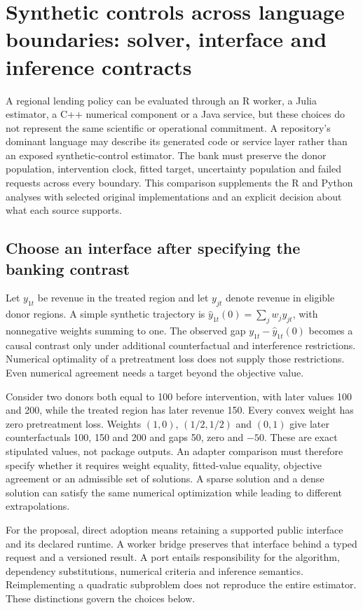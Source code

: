 \section{Synthetic controls across language boundaries: solver, interface and inference contracts}
\label{sec:exec25-synthetic-crosslanguage}

A regional lending policy can be evaluated through an R worker, a Julia
estimator, a C++ numerical component or a Java service, but these choices
do not represent the same scientific or operational commitment. A repository's
dominant language may describe its generated code or service layer rather
than an exposed synthetic-control estimator. The bank must preserve the
donor population, intervention clock, fitted target, uncertainty population
and failed requests across every boundary. This comparison supplements the
R and Python analyses with selected original implementations and an explicit
decision about what each source supports.~\citep{exec25_synthcross_choice}

\subsection{Choose an interface after specifying the banking contrast}
Let $y_{1t}$ be revenue in the treated region and let $y_{jt}$ denote revenue
in eligible donor regions. A simple synthetic trajectory is
$\widehat y_{1t}(0)=\sum_j w_jy_{jt}$, with nonnegative weights summing to one.
The observed gap $y_{1t}-\widehat y_{1t}(0)$ becomes a causal contrast only
under additional counterfactual and interference restrictions. Numerical
optimality of a pretreatment loss does not supply those restrictions.
Even numerical agreement needs a target beyond the objective value.
\citep{exec25_synthcross_choice}

Consider two donors both equal to 100 before intervention, with later values
100 and 200, while the treated region has later revenue 150. Every convex
weight has zero pretreatment loss. Weights $(1,0)$, $(1/2,1/2)$ and $(0,1)$
give later counterfactuals 100, 150 and 200 and gaps 50, zero and $-50$.
These are exact stipulated values, not package outputs. An adapter comparison
must therefore specify whether it requires weight equality, fitted-value
equality, objective agreement or an admissible set of solutions. A sparse
solution and a dense solution can satisfy the same numerical optimization
while leading to different extrapolations.~\citep{exec25_synthcross_choice}

For the proposal, direct adoption means retaining a supported public
interface and its declared runtime. A worker bridge preserves that interface
behind a typed request and a versioned result. A port entails responsibility
for the algorithm, dependency substitutions, numerical criteria and inference
semantics. Reimplementing a quadratic subproblem does not reproduce the
entire estimator. These distinctions govern the choices below.
\citep{exec25_synthcross_choice}


